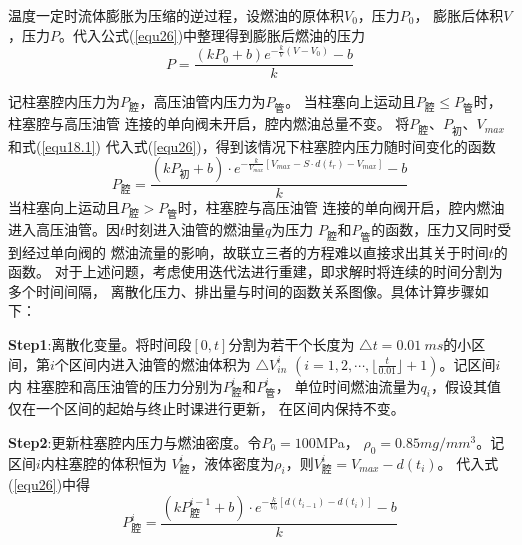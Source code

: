 \documentclass[withoutpreface,bwprint]{cumcmthesis} %
\begin{document}
    温度一定时流体膨胀为压缩的逆过程，设燃油的原体积$V_0$，压力$P_0$，
    膨胀后体积$V$，压力$P$。代入公式(\ref{equ26})中整理得到膨胀后燃油的压力
    \begin{equation}
        P=\frac{(kP_0+b)e^{-\frac{k}{V}(V-V_0)}-b}{k}
    \label{equ27}
    \end{equation}
   
    记柱塞腔内压力为$P_{\text{腔}}$，高压油管内压力为$P_{\text{管}}$。
    当柱塞向上运动且$P_{\text{腔}} \leq P_{\text{管}}$时，柱塞腔与高压油管
    连接的单向阀未开启，腔内燃油总量不变。
    将$P_{\text{腔}}$、$P_{\text{初}}$、$V_{max}$和式(\ref{equ18.1})
    代入式(\ref{equ26})，得到该情况下柱塞腔内压力随时间变化的函数
    \begin{equation}
        P_{\text{腔}}=\frac{(kP_{\text{初}}+b)\cdot e^{-\frac{k}{V_{max}}[V_{max}-S \cdot d(t_r)-V_{max}]}-b}{k}
    \label{equ29}
    \end{equation}
    当柱塞向上运动且$P_{\text{腔}} > P_{\text{管}}$时，柱塞腔与高压油管
    连接的单向阀开启，腔内燃油进入高压油管。因$t$时刻进入油管的燃油量$q$为压力
    $P_{\text{腔}}$和$P_{\text{管}}$的函数，压力又同时受到经过单向阀的
    燃油流量的影响，故联立三者的方程难以直接求出其关于时间$t$的函数。
    对于上述问题，考虑使用迭代法进行重建，即求解时将连续的时间分割为多个时间间隔，
    离散化压力、排出量与时间的函数关系图像。具体计算步骤如下：

    \textbf{Step1}:离散化变量。将时间段$[0,t]$分割为若干个长度为
    $\triangle t=0.01~ms$的小区间，第$i$个区间内进入油管的燃油体积为
    $\triangle V_{in}^i$
    $(i=1,2,\cdots,\lfloor{\frac{t}{0.01}}\rfloor+1)$。记区间$i$内
    柱塞腔和高压油管的压力分别为$P_{\text{腔}}^i$和$P_{\text{管}}^i$，
    单位时间燃油流量为$q_i$，假设其值仅在一个区间的起始与终止时课进行更新，
    在区间内保持不变。
    
    \textbf{Step2}:更新柱塞腔内压力与燃油密度。令$P_0=100$MPa，
    $\rho_0=0.85mg/mm^3$。记区间$i$内柱塞腔的体积恒为
    $V_{\text{腔}}^i$，液体密度为$\rho_i$，则$V_{\text{腔}}^i=V_{max}-d(t_i)$。
    代入式(\ref{equ26})中得
    \begin{equation}
        P_{\text{腔}}^i=\frac{(kP_{\text{腔}}^{i-1}+b)\cdot 
        e^{-\frac{k}{V_0}[d(t_{i-1})-d(t_i)]}-b}{k}
    \label{equ30}
    \end{equation}
\end{document}
